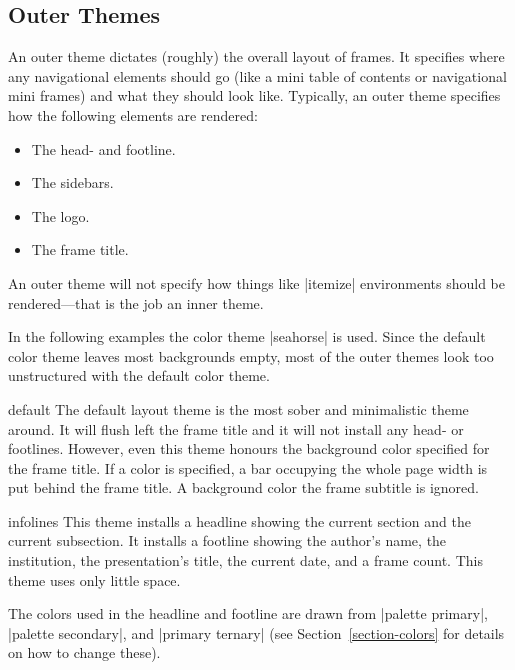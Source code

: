 \subsection{Outer Themes}

An outer theme dictates (roughly) the overall layout of frames. It
specifies where any navigational elements should go (like a mini table
of contents or navigational mini frames) and what they should look
like. Typically, an outer theme specifies how the following elements
are rendered: 
\begin{itemize}
\item The head- and footline.
\item The sidebars.
\item The logo.
\item The frame title.  
\end{itemize}

An outer theme will not specify how things like |itemize| environments
should be rendered---that is the job an inner theme.

In the following examples the color theme |seahorse| is
used. Since the default color theme leaves most backgrounds empty,
most of the outer themes look too unstructured with the default
color theme. 


\begin{outerthemeexample}{default}
  The default layout theme is the most sober and minimalistic theme
  around. It will flush left the frame title and it will not install
  any head- or footlines. However, even this theme honours the
  background color specified for the frame title. If a color is
  specified, a bar occupying the whole page width is put behind the
  frame title. A background color the frame subtitle is ignored.
\end{outerthemeexample}

\begin{outerthemeexample}{infolines}
  This theme installs a headline showing the current section and the
  current subsection. It installs a footline showing the author's
  name, the institution, the presentation's title, the current date,
  and a frame count. This theme uses only little space.

  The colors used in the headline and footline are drawn from
  |palette primary|, |palette secondary|, and |primary ternary| (see
  Section~\ref{section-colors} for details on how to change these).
\end{outerthemeexample}

